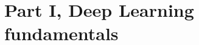 \documentclass[usenames,dvipsnames]{beamer}
\begin{document}
        
    
    

\section[DL Fundamentals]{Part I, Deep Learning fundamentals}
    
\end{document}
